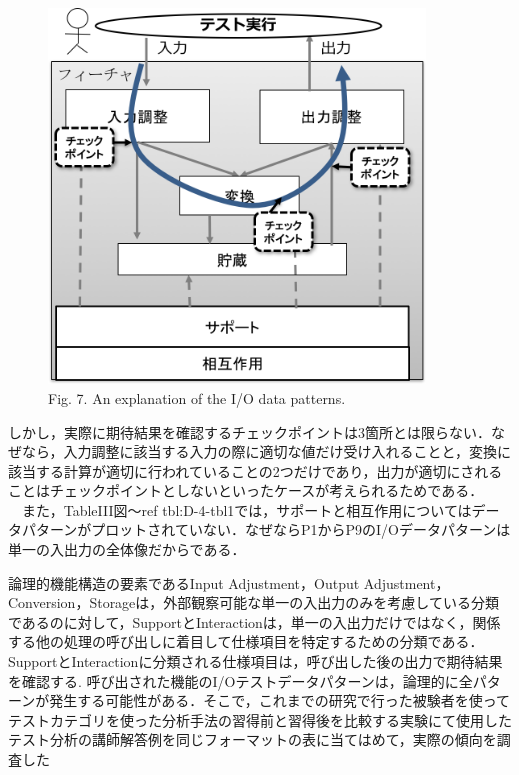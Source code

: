 \documentclass[a4paper,12pt]{jreport}
\begin{document}
   \begin{figure}[htbp]
  \begin{center}
  \includegraphics[width=10cm]{./image/D-4-Fig7.png}
  \caption{Fig. 7. An explanation of the I/O data patterns.}
  \label{fig:D-4-Fig7}
  \end{center}
   \end{figure}


しかし，実際に期待結果を確認するチェックポイントは3箇所とは限らない．なぜなら，入力調整に該当する入力の際に適切な値だけ受け入れることと，変換に該当する計算が適切に行われていることの2つだけであり，出力が適切にされることはチェックポイントとしないといったケースが考えられるためである．
　また，TableIII図〜ref {tbl:D-4-tbl1}では，サポートと相互作用についてはデータパターンがプロットされていない．なぜならP1からP9のI/Oデータパターンは単一の入出力の全体像だからである．


論理的機能構造の要素であるInput Adjustment，Output Adjustment，Conversion，Storageは，外部観察可能な単一の入出力のみを考慮している分類であるのに対して，SupportとInteractionは，単一の入出力だけではなく，関係する他の処理の呼び出しに着目して仕様項目を特定するための分類である．
SupportとInteractionに分類される仕様項目は，呼び出した後の出力で期待結果を確認する. 呼び出された機能のI/Oテストデータパターンは，論理的に全パターンが発生する可能性がある．そこで，これまでの研究で行った被験者を使ってテストカテゴリを使った分析手法の習得前と習得後を比較する実験にて使用したテスト分析の講師解答例を同じフォーマットの表に当てはめて，実際の傾向を調査した
\end{document}
